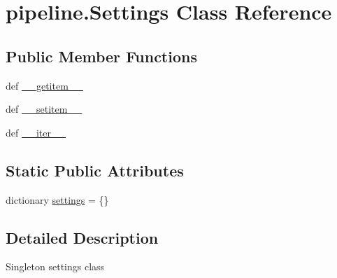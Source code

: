 \hypertarget{classpipeline_1_1_settings}{\section{pipeline.\-Settings \-Class \-Reference}
\label{classpipeline_1_1_settings}
}
\subsection*{\-Public \-Member \-Functions}
\begin{DoxyCompactItemize}
\item 
def \hyperlink{classpipeline_1_1_settings_afde7fcfb9255fafc57e0db9e2162f339}{\-\_\-\-\_\-getitem\-\_\-\-\_\-}
\item 
def \hyperlink{classpipeline_1_1_settings_a30d3f57a6de38d85ea2cc501a89219e8}{\-\_\-\-\_\-setitem\-\_\-\-\_\-}
\item 
def \hyperlink{classpipeline_1_1_settings_aee3913e2883f1b49f4b64f9cb39eb54d}{\-\_\-\-\_\-iter\-\_\-\-\_\-}
\end{DoxyCompactItemize}
\subsection*{\-Static \-Public \-Attributes}
\begin{DoxyCompactItemize}
\item 
dictionary \hyperlink{classpipeline_1_1_settings_a98be6d6bf20eed43be0bd6f3543c396c}{settings} = \{\}
\end{DoxyCompactItemize}


\subsection{\-Detailed \-Description}
\begin{DoxyVerb}Singleton settings class\end{DoxyVerb}
 

